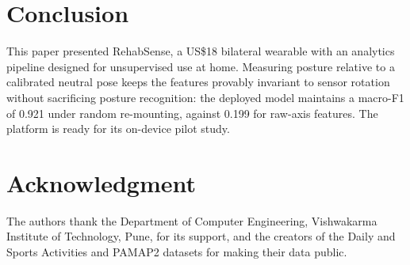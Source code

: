 \documentclass[conference]{IEEEtran}
\begin{document}
\section{Conclusion}
This paper presented RehabSense, a US\$18 bilateral wearable with an analytics pipeline designed for unsupervised use at home. Measuring posture relative to a calibrated neutral pose keeps the features provably invariant to sensor rotation without sacrificing posture recognition: the deployed model maintains a macro-F1 of 0.921 under random re-mounting, against 0.199 for raw-axis features. The platform is ready for its on-device pilot study.

\section*{Acknowledgment}
The authors thank the Department of Computer Engineering, Vishwakarma Institute of Technology, Pune, for its support, and the creators of the Daily and Sports Activities and PAMAP2 datasets for making their data public.



\end{document}
